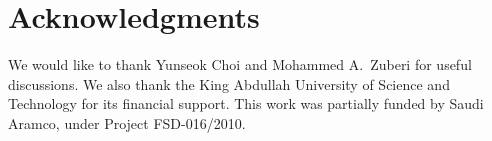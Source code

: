 \section{Acknowledgments}
We would like to thank Yunseok Choi and Mohammed A.~Zuberi for useful discussions. We also thank the King Abdullah University of Science and Technology for its financial support. This work was partially funded by Saudi Aramco, under Project FSD-016/2010.




